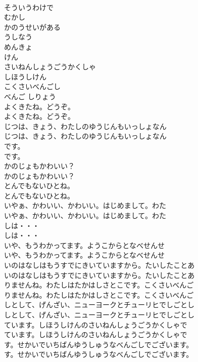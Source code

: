 \documentclass[8pt]{extreport}
\begin{document}
\begin{CJK}{UTF8}{min}
\\	そういうわけで
\\	むかし
\\	かのうせいがある
\\	うしなう
\\	めんきょ
\\	けん
\\	さいねんしょうごうかくしゃ
\\	しほうしけん
\\	こくさいべんごし
\\	べんご しりょう
\\	よくきたね。どうぞ。
\\	よくきたね。どうぞ。
\\	じつは、きょう、わたしのゆうじんもいっしょなん
\\	じつは、きょう、わたしのゆうじんもいっしょなん
\\	です。
\\	です。
\\	かのじょもかわいい？
\\	かのじょもかわいい？
\\	とんでもないひとね。
\\	とんでもないひとね。
\\	いやぁ、かわいい、かわいい。はじめまして。わた
\\	いやぁ、かわいい、かわいい。はじめまして。わた
\\	しは・・・
\\	しは・・・
\\	いや、もうわかってます。ようこからとなべせんせ
\\	いや、もうわかってます。ようこからとなべせんせ
\\	いのはなしはもうすでにきいていますから。たいしたことあ
\\	いのはなしはもうすでにきいていますから。たいしたことあ
\\	りませんね。わたしはたかはしさとこです。こくさいべんご
\\	りませんね。わたしはたかはしさとこです。こくさいべんご
\\	しとして、げんざい、ニューヨークとチューリヒでしごとし
\\	しとして、げんざい、ニューヨークとチューリヒでしごとし
\\	ています。しほうしけんのさいねんしょうごうかくしゃで
\\	ています。しほうしけんのさいねんしょうごうかくしゃで
\\	す。せかいでいちばんゆうしゅうなべんごしでございます。
\\	す。せかいでいちばんゆうしゅうなべんごしでございます。

\end{CJK}
\end{document}
